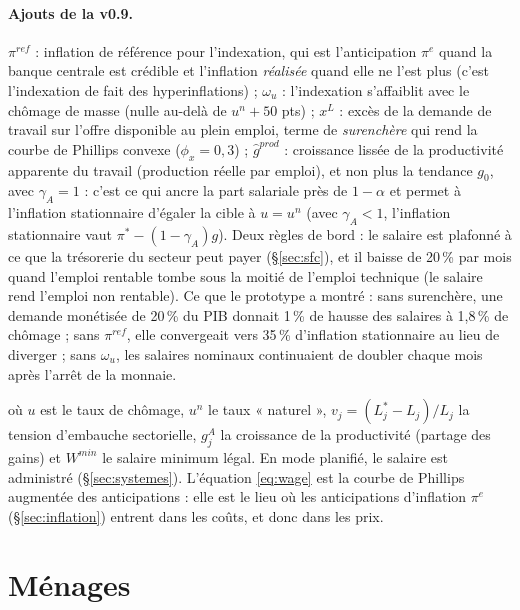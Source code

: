 \documentclass[11pt,a4paper]{article}
\newcommand{\og}{« }
\newcommand{\fg}{ »}
\begin{document}
\begin{lecture}
\paragraph{Ajouts de la v0.9.} $\pi^{ref}$ : inflation de référence pour l'indexation, qui est l'anticipation $\pi^e$ quand la banque centrale est crédible et l'inflation \emph{réalisée} quand elle ne l'est plus (c'est l'indexation de fait des hyperinflations) ; $\omega_u$ : l'indexation s'affaiblit avec le chômage de masse (nulle au-delà de $u^n+50$ pts) ; $x^L$ : excès de la demande de travail sur l'offre disponible au plein emploi, terme de \emph{surenchère} qui rend la courbe de Phillips convexe ($\phi_x=0{,}3$) ; $\hat g^{prod}$ : croissance lissée de la productivité apparente du travail (production réelle par emploi), et non plus la tendance $g_0$, avec $\gamma_A=1$ : c'est ce qui ancre la part salariale près de $1-\alpha$ et permet à l'inflation stationnaire d'égaler la cible à $u=u^n$ (avec $\gamma_A<1$, l'inflation stationnaire vaut $\pi^\ast-(1-\gamma_A)g$). Deux règles de bord : le salaire est plafonné à ce que la trésorerie du secteur peut payer (\S\ref{sec:sfc}), et il baisse de 20\,\% par mois quand l'emploi rentable tombe sous la moitié de l'emploi technique (le salaire rend l'emploi non rentable). Ce que le prototype a montré : sans surenchère, une demande monétisée de 20\,\% du PIB donnait 1\,\% de hausse des salaires à 1,8\,\% de chômage ; sans $\pi^{ref}$, elle convergeait vers 35\,\% d'inflation stationnaire au lieu de diverger ; sans $\omega_u$, les salaires nominaux continuaient de doubler chaque mois après l'arrêt de la monnaie.
\end{lecture}
où $u$ est le taux de chômage, $u^n$ le taux \og naturel\fg, $v_j = (L^\ast_j - L_j)/L_j$ la tension d'embauche sectorielle, $g^A_j$ la croissance de la productivité (partage des gains) et $W^{min}$ le salaire minimum légal. En mode planifié, le salaire est administré (\S\ref{sec:systemes}). L'équation \eqref{eq:wage} est la courbe de Phillips augmentée des anticipations : elle est le lieu où les anticipations d'inflation $\pi^e$ (\S\ref{sec:inflation}) entrent dans les coûts, et donc dans les prix.

\section{Ménages}
\label{sec:menages}
\end{document}
